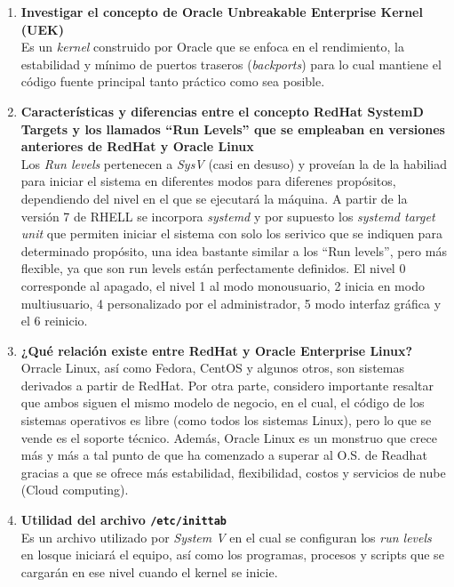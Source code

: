 \documentclass{article}
\begin{document}
\begin{enumerate}[label=\protect\textbf{\Alph*.}]
    \item \textbf{Investigar el concepto de Oracle Unbreakable Enterprise 
        Kernel (UEK)}\\
        Es un \textit{kernel} construido por Oracle que se enfoca en el 
        rendimiento, la estabilidad y mínimo de puertos traseros
        (\textit{backports}) para lo cual mantiene el código fuente principal 
        tanto práctico como sea posible.

    \item \textbf{Características y diferencias entre el concepto RedHat 
        SystemD Targets y los llamados “Run Levels” que se empleaban en 
        versiones anteriores de RedHat y Oracle Linux}\\
        Los \textit{Run levels} pertenecen a \textit{SysV} (casi en desuso) y
        proveían la de la habiliad para iniciar el sistema en diferentes modos 
        para diferenes propósitos, dependiendo del nivel en el que se ejecutará
        la máquina. A partir de la versión 7 de RHELL se incorpora 
        \textit{systemd} y por supuesto los \textit{systemd target unit} que
        permiten iniciar el sistema con solo los serivico que se indiquen para 
        determinado propósito, una idea bastante similar a los ``Run levels'',
        pero más flexible, ya que son run levels están perfectamente definidos.
        El nivel 0 corresponde al apagado, el nivel 1 al modo monousuario, 2 
        inicia en modo multiusuario, 4 personalizado por el administrador, 5
        modo interfaz gráfica y el 6 reinicio.

    \item \textbf{¿Qué relación existe entre RedHat y Oracle Enterprise 
        Linux?}\\
        Orracle Linux, así como Fedora, CentOS y algunos otros, son sistemas 
        derivados a partir de RedHat. Por otra parte, considero importante 
        resaltar que ambos siguen el mismo modelo de negocio, en el cual, el 
        código de los sistemas operativos es libre (como todos los sistemas 
        Linux), pero lo que se vende es el soporte técnico. Además, Oracle 
        Linux es un monstruo que crece más y más a tal punto de que ha comenzado
        a superar al O.S. de Readhat gracias a que se ofrece más estabilidad,
        flexibilidad, costos y servicios de nube (Cloud computing).

    \item \textbf{Utilidad del archivo \texttt{/etc/inittab}}\\
        Es un archivo utilizado por \textit{System V} en el cual se configuran
        los \textit{run levels} en losque iniciará el equipo, así como los 
        programas, procesos y scripts que se cargarán en ese nivel cuando el 
        kernel se inicie.
\end{enumerate}
\end{document}

